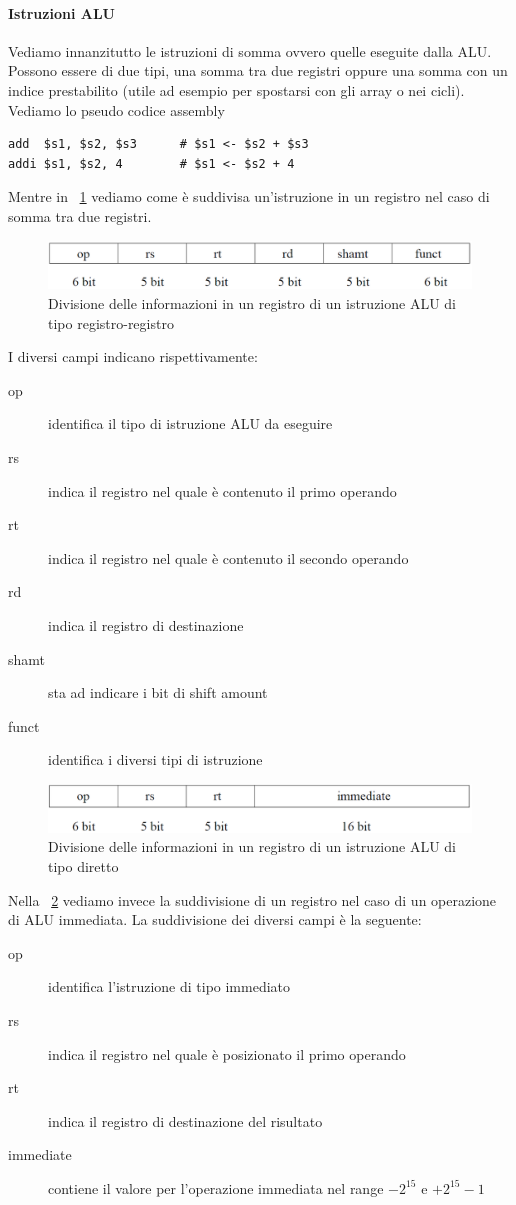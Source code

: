 \paragraph{Istruzioni ALU}
Vediamo innanzitutto le istruzioni di somma ovvero quelle eseguite dalla ALU. Possono essere di due tipi, una somma tra due registri oppure una somma con un indice prestabilito (utile ad esempio per spostarsi con gli array o nei cicli).
Vediamo lo pseudo codice assembly
\begin{verbatim}
add  $s1, $s2, $s3      # $s1 <- $s2 + $s3
addi $s1, $s2, 4        # $s1 <- $s2 + 4
\end{verbatim}
Mentre in \figurename~\ref{fig:regALU} vediamo come è suddivisa un'istruzione in un registro nel caso di somma tra due registri.
\begin{figure}[htb]
\centering
\includegraphics[scale=0.5]{img/regALU.png}
\caption{Divisione delle informazioni in un registro di un istruzione ALU di tipo registro-registro}\label{fig:regALU}
\end{figure}
I diversi campi indicano rispettivamente:
\begin{description}
\item[op] identifica il tipo di istruzione ALU da eseguire
\item[rs] indica il registro nel quale è contenuto il primo operando
\item[rt] indica il registro nel quale è contenuto il secondo operando
\item[rd] indica il registro di destinazione
\item[shamt] sta ad indicare i bit di shift amount
\item[funct] identifica i diversi tipi di istruzione
\end{description}
\begin{figure}[htb]
\centering
\includegraphics[scale=0.5]{img/ALUdir.png}
\caption{Divisione delle informazioni in un registro di un istruzione ALU di tipo diretto}\label{fig:ALUdir}
\end{figure}
Nella \figurename~\ref{fig:ALUdir} vediamo invece la suddivisione di un registro nel caso di un operazione di ALU immediata.
La suddivisione dei diversi campi è la seguente:
\begin{description}
\item[op] identifica l'istruzione di tipo immediato
\item[rs] indica il registro nel quale è posizionato il primo operando
\item[rt] indica il registro di destinazione del risultato
\item[immediate] contiene il valore per l'operazione immediata nel range $-2^{15}$ e $+2^{15}-1$
\end{description}
